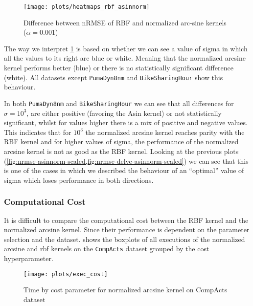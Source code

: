 \begin{figure}[H]
    \texttt{[image: plots/heatmaps\_rbf\_asinnorm]}
    \caption{Difference between nRMSE of RBF and normalized arc-sine kernels ($\alpha=0.001$)}
    \label{fig:paired-ttest-rbf-asinnorm-diff}
\end{figure}

The way we interpret \cref{fig:paired-ttest-rbf-asinnorm-diff} is based on whether
we can see a value of sigma in which all the values to its right are blue or white.
Meaning that the normalized arcsine kernel performs better (blue) or there is no
statistically significant difference (white). All datasets except
\texttt{PumaDyn8nm} and \texttt{BikeSharingHour} show this behaviour.

In both \texttt{PumaDyn8nm} and \texttt{BikeSharingHour} we can see that all
differences for $\sigma=10^3$, are either positive (favoring the Asin kernel) or
not statistically significant, whilst for values higher there is a mix of positive
and negative values. This indicates that for $10^3$ the normalized arcsine kernel
reaches parity with the RBF kernel and for higher values of sigma, the performance
of the normalized arcsine kernel is not as good as the RBF kernel. Looking
at the previous plots (\cref{fig:nrmse-asinnorm-scaled,fig:nrmse-delve-asinnorm-scaled})
we can see that this is one of the cases in which we described the behaviour of
an ``optimal'' value of sigma which loses performance in both directions.

\subsubsection{Computational Cost}

It is difficult to compare the computational cost between the RBF kernel
and the normalized arcsine kernel. Since their performance is dependent
on the parameter selection and the dataset. 
shows the boxplots of all executions of the normalized arcsine and rbf kernels
on the \texttt{CompActs} dataset grouped by the cost hyperparameter.

\begin{figure}[H]
    \texttt{[image: plots/exec\_cost]}
    \caption{Time by cost parameter for normalized arcsine kernel on CompActs dataset}
    \label{fig:time-asinnorm-scaled-compacts}
\end{figure}

